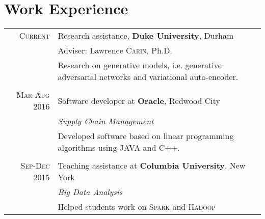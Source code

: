 \documentclass[a4paper,10pt]{article}
\begin{document}
\section{Work Experience}
\begin{tabular}{r|p{11cm}}
 \textsc{Current} & Research assistance, \textbf{Duke University}, Durham \\
 & \small Adviser: Lawrence \textsc{Carin}, Ph.D. \\
&\footnotesize{Research on generative models, i.e. generative adversarial networks and variational auto-encoder.}\\
\multicolumn{2}{c}{} \\
 \textsc{Mar-Aug 2016} & Software developer at \textbf{Oracle}, Redwood City \\
 &\emph{Supply Chain Management}\\
 &\footnotesize{Developed software based on linear programming algorithms using JAVA and C++.}\\
 \multicolumn{2}{c}{} \\
\textsc{Sep-Dec 2015} & Teaching assistance at \textbf{Columbia University}, New York \\& \emph{Big Data Analysis}\\&\footnotesize{Helped students work on \textsc{Spark} and \textsc{Hadoop} }
\end{tabular}

\end{document}
